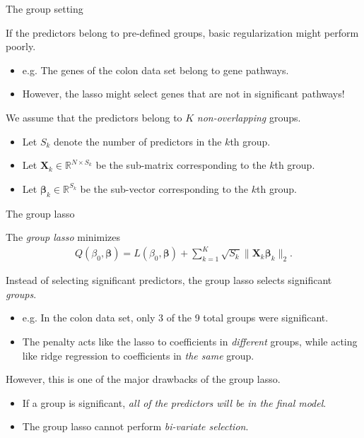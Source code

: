 \documentclass[8pt]{beamer}
\newcommand{\mys}{\vspace{0.5cm} \pause
}
\newcommand{\mysa}{\vspace{0.2cm} \pause
}
\begin{document}
\begin{frame}{The group setting}

If the predictors belong to pre-defined groups, basic regularization might perform poorly.
\begin{itemize}
    \item e.g. The genes of the colon data set belong to gene pathways.
    \item However, the lasso might select genes that are not in significant pathways! %
\end{itemize} \mys

We assume that the predictors belong to $K$ \textit{non-overlapping} groups.
\begin{itemize}
    \item Let $S_k$ denote the number of predictors in the $k$th group.
    \item Let $\mathbf{X}_k \in \mathbb{R}^{N \times S_k}$ be the sub-matrix corresponding to the $k$th group.
    \item Let $\bm{\beta}_k \in \mathbb{R}^{S_k}$ be the sub-vector corresponding to the $k$th group.
\end{itemize} %

    
\end{frame}

\begin{frame}{\color{white} The group lasso}

The \textit{group lasso} minimizes 
\begin{align}
    \label{grouplasso}
    Q(\beta_0, \bm{\beta}) = L(\beta_0, \bm{\beta}) + \sum_{k=1}^K \sqrt{S_k} \| \mathbf{X}_k \bm{\beta}_k \|_2.
\end{align} \mysa

Instead of selecting significant predictors, the group lasso selects significant \textit{groups}.
\begin{itemize}
    \item e.g. In the colon data set, only 3 of the 9 total groups were significant.
    \item The penalty acts like the lasso to coefficients in \textit{different} groups, while acting like ridge regression to coefficients in \textit{the same} group.
\end{itemize} \mys

However, this is one of the major drawbacks of the group lasso.
\begin{itemize}
    \item If a group is significant, \textit{all of the predictors will be in the final model}.
    \item The group lasso cannot perform \textit{bi-variate selection}.
\end{itemize}
    
\end{frame}
\end{document}
